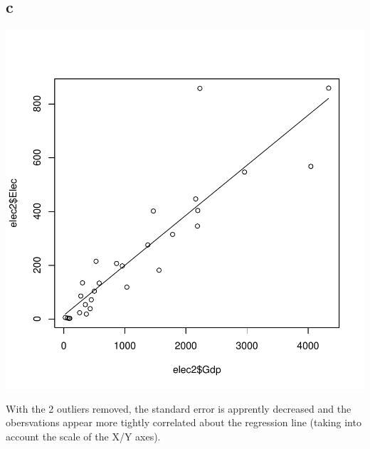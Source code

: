 \documentclass{article}
\begin{document}
\subsection*{c}
\begin{Schunk}
\end{Schunk}
\includegraphics{Assignment1b-003}

\noindent
With the 2 outliers removed, the standard error is apprently decreased and the obersvations appear more tightly correlated about the regression line (taking into account the scale of the X/Y axes). 
\end{document}
